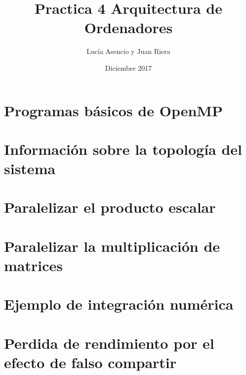 \documentclass{report}
\title{Practica 4 Arquitectura de Ordenadores}
\author{Lucía Asencio y Juan Riera}
\date{Diciembre 2017}
\begin{document}
\maketitle
\section{Programas básicos de OpenMP}

\newpage
\section{Información sobre la topología del sistema}


\newpage
\section {Paralelizar el producto escalar}


\newpage
\section {Paralelizar la multiplicación de matrices}


\newpage
\section{Ejemplo de integración numérica}


\newpage
\section {Perdida de rendimiento por el efecto de falso compartir}
\end{document}
